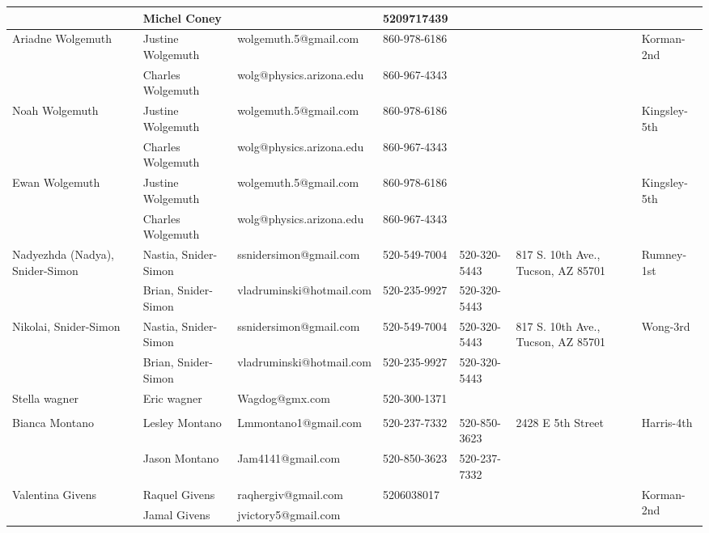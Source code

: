 \documentclass[landscape]{book}\usepackage[]{graphicx}\usepackage[]{color}
\begin{document}
\begin{longtable}{p{70pt}|p{75pt}|p{120pt}|p{60pt}|p{60pt}|p{100pt}|p{70pt}|}
 & Michel Coney &  & 5209717439 &  & & \\
\hline
\multirow{2}{70pt}{Ariadne Wolgemuth} & Justine Wolgemuth & wolgemuth.5@gmail.com & 860-978-6186 &  & \multirow{2}{100pt}{} & \multirow{2}{70pt}{Korman-2nd}\\
 & Charles Wolgemuth & wolg@physics.arizona.edu & 860-967-4343 &  & & \\
\hline
\multirow{2}{70pt}{Noah Wolgemuth} & Justine Wolgemuth & wolgemuth.5@gmail.com & 860-978-6186 &  & \multirow{2}{100pt}{} & \multirow{2}{70pt}{Kingsley-5th}\\
 & Charles Wolgemuth & wolg@physics.arizona.edu & 860-967-4343 &  & & \\
\hline
\multirow{2}{70pt}{Ewan Wolgemuth} & Justine Wolgemuth & wolgemuth.5@gmail.com & 860-978-6186 &  & \multirow{2}{100pt}{} & \multirow{2}{70pt}{Kingsley-5th}\\
 & Charles Wolgemuth & wolg@physics.arizona.edu & 860-967-4343 &  & & \\
\hline
\multirow{2}{70pt}{Nadyezhda (Nadya), Snider-Simon} & Nastia, Snider-Simon & ssnidersimon@gmail.com & 520-549-7004 & 520-320-5443 & \multirow{2}{100pt}{817 S. 10th Ave., Tucson, AZ 85701} & \multirow{2}{70pt}{Rumney-1st}\\
 & Brian, Snider-Simon & vladruminski@hotmail.com & 520-235-9927 & 520-320-5443 & & \\
\hline
\multirow{2}{70pt}{Nikolai, Snider-Simon} & Nastia, Snider-Simon & ssnidersimon@gmail.com & 520-549-7004 & 520-320-5443 & \multirow{2}{100pt}{817 S. 10th Ave., Tucson, AZ 85701} & \multirow{2}{70pt}{Wong-3rd}\\
 & Brian, Snider-Simon & vladruminski@hotmail.com & 520-235-9927 & 520-320-5443 & & \\
\hline
\multirow{2}{70pt}{Stella wagner} & Eric wagner & Wagdog@gmx.com & 520-300-1371 &  & \multirow{2}{100pt}{} & \multirow{2}{70pt}{}\\
 &  &  &  &  & & \\
\hline
\multirow{2}{70pt}{Bianca Montano} & Lesley Montano & Lmmontano1@gmail.com & 520-237-7332 & 520-850-3623 & \multirow{2}{100pt}{2428 E 5th Street} & \multirow{2}{70pt}{Harris-4th}\\
 & Jason Montano & Jam4141@gmail.com & 520-850-3623 & 520-237-7332 & & \\
\hline
\multirow{2}{70pt}{Valentina Givens} & Raquel Givens & raqhergiv@gmail.com & 5206038017 &  & \multirow{2}{100pt}{} & \multirow{2}{70pt}{Korman-2nd}\\
 & Jamal Givens & jvictory5@gmail.com &  &  & & \\

\end{longtable}
\end{document}
